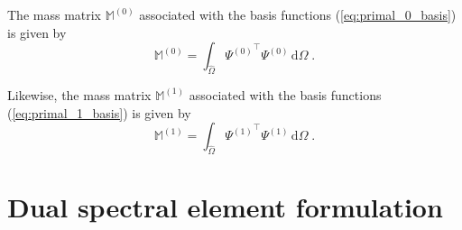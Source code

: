\documentclass[graybox]{svmult}
\begin{document}
The mass matrix $\mathbb{M}^{(0)}$ associated with the basis functions (\ref{eq:primal_0_basis}) is given by
\begin{equation}
\mathbb{M}^{(0)} = \int_{\hat{\Omega}} {\Psi^{(0)}}^{\top} \Psi^{(0)}\,\mathrm{d} \Omega \;.
\label{eq:M0}
\end{equation}

Likewise, the mass matrix $\mathbb{M}^{(1)}$ associated with the basis functions (\ref{eq:primal_1_basis}) is given by
\begin{equation}
\mathbb{M}^{(1)} = \int_{\hat{\Omega}} {\Psi^{(1)}}^{\top} \Psi^{(1)}\,\mathrm{d} \Omega \;.
\label{eq:M1}
\end{equation}

\section{Dual spectral element formulation}\label{sec:dual_formulation}
\end{document}
